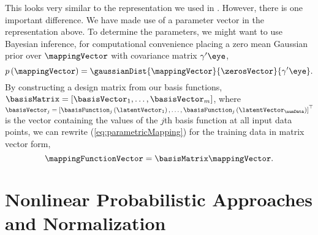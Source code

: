 This looks very similar to the representation we used in
. However, there is one important difference. We have
made use of a parameter vector in the representation above. To
determine the parameters, we might want to use Bayesian inference, for
computational convenience placing a zero mean Gaussian prior over
$\mappingVector$ with covariance matrix $\gamma^\prime\eye$,
\[
p\left(\mappingVector\right) = \gaussianDist{\mappingVector}{\zerosVector}{\gamma^\prime \eye}.
\]
By constructing a design matrix from our basis functions,
$\basisMatrix=\left[\basisVector_1, \dots,
  \basisVector_m\right]$, where
$\basisVector_j=\left[\basisFunction_j\left(\latentVector_1\right), \dots,
  \basisFunction_j\left(\latentVector_\numData\right)\right]^\top$ is the vector
containing the values of the $j$th basis function at all input data
points, we can rewrite (\ref{eq:parametricMapping}) for the training
data in matrix vector form,
\[
\mappingFunctionVector = \basisMatrix\mappingVector.
\]

\section{Nonlinear Probabilistic Approaches and Normalization}

